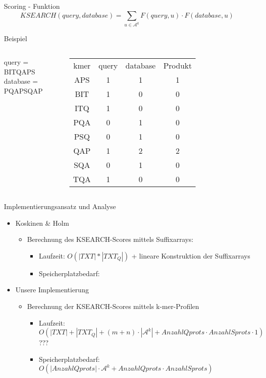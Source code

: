 \documentclass[aspectratio=1610]{beamer}
\begin{document}
\begin{frame}{Scoring - Funktion}
  \begin{equation*}
    KSEARCH(query,database) = \sum_{u \in \mathcal A^k} F(query,u) \cdot F(database,u)
  \end{equation*}  
  \begin{block}{Beispiel}
    \begin{columns}
    query = BITQAPS\\
    database = PQAPSQAP\\  
    \scriptsize\begin{tabular}{cccc}
    kmer & query & database & Produkt\\
    APS & 1 & 1 & 1\\
    BIT & 1 & 0 & 0\\
    ITQ & 1 & 0 & 0 \\
    PQA & 0 & 1 & 0\\
    PSQ & 0 & 1 & 0\\
    QAP & 1 & 2 & 2\\
    SQA & 0 & 1 & 0\\
    TQA & 1 & 0 & 0\\    
    \end{tabular}
    \normalsize
    \end{columns}
  \end{block}
\end{frame}

\begin{frame}{Implementierungsansatz und Analyse}
  \begin{itemize}
    \item Koskinen \& Holm
      \begin{itemize}
        \item Berechnung des KSEARCH-Scores mittels Suffixarrays:
          \begin{itemize}
            \item Laufzeit: $O(|TXT|*|TXT_Q|)$ + lineare Konstruktion der Suffixarrays
            \item Speicherplatzbedarf:
          \end{itemize}
      \end{itemize}
    \item Unsere Implementierung
      \begin{itemize}
        \item Berechnung der KSEARCH-Scores mittels k-mer-Profilen
          \begin{itemize}
            \item Laufzeit: $O(|TXT|+|TXT_Q|+(m+n) \cdot |\mathcal A^k|+ Anzahl Qprots \cdot Anzahl Sprots \cdot 1)$ ???
            \item Speicherplatzbedarf: $O(|Anzahl Qprots| \cdot \mathcal A^k + Anzahl Qprots \cdot Anzahl Sprots)$
          \end{itemize}
      \end{itemize}
  \end{itemize}
\end{frame}
\end{document}
